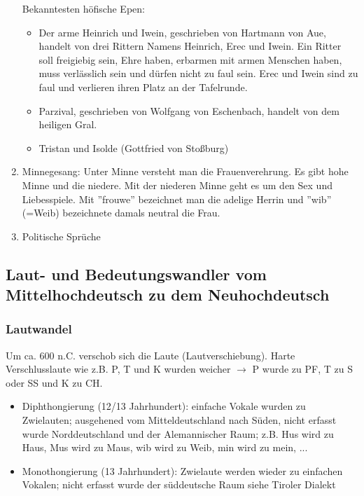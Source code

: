 \documentclass[12pt,a4paper]{article}
\begin{document}
\begin{enumerate}
		Bekanntesten höfische Epen:
		
			\begin{itemize}
			\item Der arme Heinrich und Iwein, geschrieben von Hartmann von Aue, handelt von drei Rittern Namens 						Heinrich, Erec und Iwein. Ein Ritter soll freigiebig sein, Ehre
			haben, erbarmen mit armen Menschen haben, muss verlässlich sein und dürfen nicht zu faul sein. Erec und
			Iwein sind zu faul und verlieren ihren Platz an der Tafelrunde.
			
			\item Parzival, geschrieben von Wolfgang von Eschenbach, handelt von dem heiligen Gral.				
			
			\item Tristan und Isolde (Gottfried von Stoßburg)
			\end{itemize}				
	
		\item Minnegesang: Unter Minne versteht man die Frauenverehrung. Es gibt hohe Minne und die niedere. Mit 
		der niederen Minne geht es um den Sex und Liebesspiele. Mit ''frouwe'' bezeichnet man die adelige Herrin und
		''wib'' (=Weib) bezeichnete 	damals neutral die Frau.
		
		\item Politische Sprüche
	
\end{enumerate}	
	
\subsection{Laut- und Bedeutungswandler vom Mittelhochdeutsch zu dem Neuhochdeutsch}

\subsubsection{Lautwandel}
Um ca. 600 n.C. verschob sich die Laute (Lautverschiebung). Harte Verschlusslaute wie z.B. P, T und K wurden weicher $\rightarrow$ P wurde zu PF, T zu S oder SS und K zu CH.

\begin{itemize}
\item Diphthongierung (12/13 Jahrhundert): einfache Vokale wurden zu Zwielauten; ausgehened vom Mitteldeutschland nach
Süden, nicht erfasst wurde Norddeutschland und der Alemannischer Raum; z.B. Hus wird zu Haus, Mus wird zu Maus, wib wird
zu Weib, min wird zu mein, ...

\item Monothongierung (13 Jahrhundert): Zwielaute werden wieder zu einfachen Vokalen; nicht erfasst wurde der süddeutsche Raum siehe Tiroler Dialekt
\end{itemize}
\end{document}
